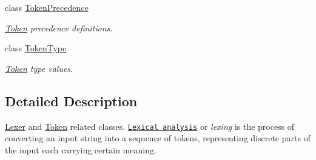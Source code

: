\begin{DoxyCompactItemize}
class \hyperlink{classMathParser_1_1Lexing_1_1TokenPrecedence}{Token\-Precedence}
\begin{DoxyCompactList}\small\item\em \hyperlink{classMathParser_1_1Lexing_1_1Token}{Token} precedence definitions. \end{DoxyCompactList}\item 
class \hyperlink{classMathParser_1_1Lexing_1_1TokenType}{Token\-Type}
\begin{DoxyCompactList}\small\item\em \hyperlink{classMathParser_1_1Lexing_1_1Token}{Token} type values. \end{DoxyCompactList}\end{DoxyCompactItemize}


\subsection{Detailed Description}
\hyperlink{classMathParser_1_1Lexing_1_1Lexer}{Lexer} and \hyperlink{classMathParser_1_1Lexing_1_1Token}{Token} related classes. \href{https://en.wikipedia.org/wiki/Lexical_analysis}{\tt Lexical analysis} or {\itshape lexing} is the process of converting an input string into a sequence of tokens, representing discrete parts of the input each carrying certain meaning. 